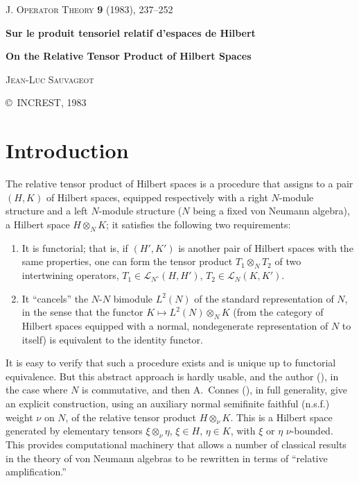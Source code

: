 \documentclass[fontsize=13pt,twoside,headings=small,bookmarkpackage=false]{scrartcl}
\newcommand{\Lop}{\mathcal L}
\begin{document}
\setcounter{page}{1}
\thispagestyle{empty}
\begin{center}
{\small\textsc{J. Operator Theory} \textbf{9} (1983), 237--252\par}
\vspace{.8\baselineskip}
{\fontsize{17}{20}\selectfont\bfseries
Sur le produit tensoriel relatif d'espaces de Hilbert\par}
\vspace{.55\baselineskip}
{\fontsize{18}{21}\selectfont\bfseries
On the Relative Tensor Product of Hilbert Spaces\par}
\vspace{.7\baselineskip}
{\scshape Jean-Luc Sauvageot\par}
\vspace{.3\baselineskip}
{\footnotesize\copyright\ INCREST, 1983\par}
\end{center}

\section*{Introduction}
\label{sec:intro}
The relative tensor product of Hilbert spaces is a procedure that assigns to a pair $(H,K)$ of Hilbert spaces, equipped respectively with a right $N$-module structure and a left $N$-module structure ($N$ being a fixed von Neumann algebra), a Hilbert space $H\otimes_N K$; it satisfies the following two requirements:
\begin{enumerate}[label=\arabic*)]
\item It is functorial; that is, if $(H',K')$ is another pair of Hilbert spaces with the same properties, one can form the tensor product $T_1\otimes_N T_2$ of two intertwining operators, $T_1\in\Lop_{N^\circ}(H,H')$, $T_2\in\Lop_N(K,K')$.
\item It ``cancels'' the $N$-$N$ bimodule $L^2(N)$ of the standard representation of $N$, in the sense that the functor $K\mapsto L^2(N)\otimes_N K$ (from the category of Hilbert spaces equipped with a normal, nondegenerate representation of $N$ to itself) is equivalent to the identity functor.
\end{enumerate}
It is easy to verify that such a procedure exists and is unique up to functorial equivalence. But this abstract approach is hardly usable, and the author (\cite{8}), in the case where $N$ is commutative, and then A.~Connes (\cite{2}), in full generality, give an explicit construction, using an auxiliary normal semifinite faithful (n.s.f.) weight $\nu$ on $N$, of the relative tensor product $H\otimes_\nu K$. This is a Hilbert space generated by elementary tensors $\xi\otimes_\nu\eta$, $\xi\in H$, $\eta\in K$, with $\xi$ or $\eta$ $\nu$-bounded. This provides computational machinery that allows a number of classical results in the theory of von Neumann algebras to be rewritten in terms of ``relative amplification.''
\end{document}
